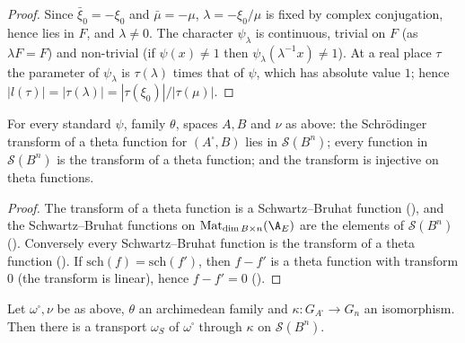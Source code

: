 \begin{proof}
Since $\bar\xi_0=-\xi_0$ and $\bar\mu=-\mu$, $\lambda=-\xi_0/\mu$ is fixed by complex conjugation, hence lies in $F$, and $\lambda\ne0$. The
character $\psi_\lambda$ is continuous, trivial on $F$ (as $\lambda F=F$) and non-trivial (if $\psi(x)\ne1$ then $\psi_\lambda(\lambda^{-1}x)\ne1$).
At a real place $\tau$ the parameter of $\psi_\lambda$ is $\tau(\lambda)$ times that of $\psi$, which has absolute value $1$; hence
$|l(\tau)|=|\tau(\lambda)|=|\tau(\xi_0)|/|\tau(\mu)|$.
\end{proof}

\begin{lemma}\label{pf:stageU:schschwartz}
For every standard $\psi$, family $\theta$, spaces $A,B$ and $\nu$ as above: the Schr\"odinger transform of a theta function for
$(A^\square,B)$ lies in $\mathcal S(B^n)$; every function in $\mathcal S(B^n)$ is the transform of a theta function; and the transform
is injective on theta functions.
\end{lemma}

\begin{proof}
The transform of a theta function is a Schwartz--Bruhat function
(), and the Schwartz--Bruhat functions on
$\mathrm{Mat}_{\dim B\times n}(\A_E)$ are the elements of $\mathcal S(B^n)$ ().
Conversely every Schwartz--Bruhat function is the transform of a theta function
(). If $\mathrm{sch}(f)=\mathrm{sch}(f')$, then $f-f'$ is a theta function
with transform $0$ (the transform is linear), hence $f-f'=0$ ().
\end{proof}

\begin{lemma}\label{pf:stageU:transport}
Let $\omega^\square,\nu$ be as above, $\theta$ an archimedean family and $\kappa:G_{A^\square}\to G_n$ an isomorphism. Then there is a
transport $\omega_S$ of $\omega^\square$ through $\kappa$ on $\mathcal S(B^n)$.
\end{lemma}

